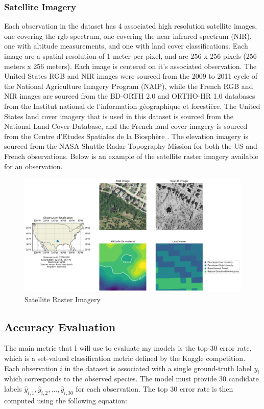 \documentclass[12pt, oneside]{article}
\begin{document}
\begin{normalsize}
\subsubsection{Satellite Imagery}

Each observation in the dataset has 4 associated high resolution satellite images, one covering the rgb spectrum, one covering the near infrared spectrum (NIR), one with altitude measurements, and one with land cover classifications. Each image are a spatial resolution of 1 meter per pixel, and are 256 x 256 pixels (256 meters x 256 meters). Each image is centered on it's associated observation. The United States RGB and NIR images were sourced from the 2009 to 2011 cycle of the National Agriculture Imagery Program (NAIP), while the French RGB and NIR images are sourced from the BD-ORTH 2.0 and ORTHO-HR 1.0 databases from the Institut national de l'information géographique et forestière. The United States land cover imagery that is used in this dataset is sourced from the National Land Cover Database, and the French land cover imagery is sourced from the Centre d'Etudes Spatiales de la Biosphère \cite{homer2015completion}. The elevation imagery is sourced from the NASA Shuttle Radar Topography Mission for both the US and French observations. Below is an example of the satellite raster imagery available for an observation.

\begin{figure}[H]
\caption{Satellite Raster Imagery}
\centering
\includegraphics[width=1\textwidth]{raster}
\end{figure}

\subsection{Accuracy Evaluation}

The main metric that I will use to evaluate my models is the top-30 error rate, which is a set-valued classification metric defined by the Kaggle competition. Each observation $i$ in the dataset is associated with a single ground-truth label $y_{i}$ which corresponds to the observed species. The model must provide 30 candidate labels $\hat{y}_{i,1},\hat{y}_{i,2}, ... , \hat{y}_{i,30}$ for each observation. The top 30 error rate is then computed using the following equation:


\end{normalsize}
\end{document}

